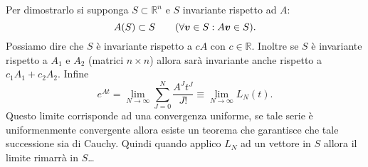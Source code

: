 \noindent
Per dimostrarlo si supponga $S \subset \mathbb{R}^n$ e $S$ invariante rispetto ad $A$:
\[
    A(S) \subset S \qquad (\forall \boldsymbol{v}\in S: A\boldsymbol{v}\in S) 
.\] 
Possiamo dire che $S$  è invariante rispetto a $cA$  con $c\in \mathbb{R}$. Inoltre se $S$  è invariante rispetto a $A_1$  e $A_2$  (matrici $n \times n$) allora sarà invariante anche rispetto a $c_1A_1 + c_2A_2$. Infine
\[
    e^{At}=\lim_{N \to \infty}\sum_{J=0}^{N} \frac{A^J t^J}{J!} \equiv \lim_{N \to \infty} L_N(t) 
.\] 
Questo limite corrisponde ad una convergenza uniforme, se tale serie è uniformenmente convergente allora esiste un teorema che garantisce che tale successione sia di Cauchy. Quindi quando applico $L_N$ ad un vettore in $S$ allora il limite rimarrà in $S$\ldots{} 


